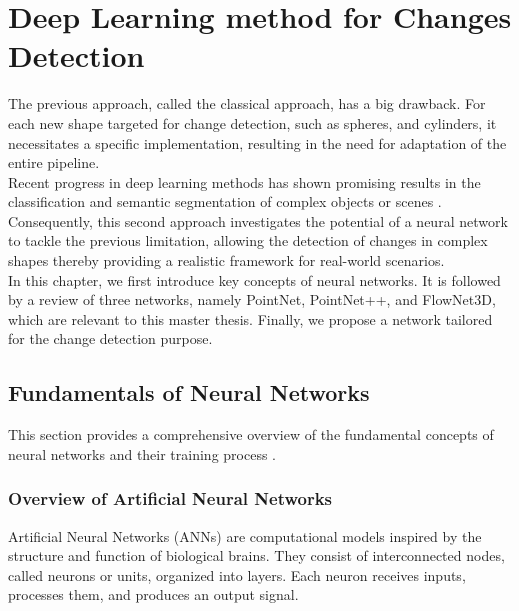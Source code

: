 \chapter{Deep Learning method for Changes Detection}
The previous approach, called the classical approach, has a big drawback. For each new shape targeted for change detection, such as spheres, and cylinders, it necessitates a specific implementation, resulting in the need for adaptation of the entire pipeline.\\

Recent progress in deep learning methods has shown promising results in the classification and semantic segmentation of complex objects or scenes \cite{DeepLearningPointCloud}. Consequently, this second approach investigates the potential of a neural network to tackle the previous limitation, allowing the detection of changes in complex shapes thereby providing a realistic framework for real-world scenarios.\\

In this chapter, we first introduce key concepts of neural networks. It is followed by a review of three networks, namely PointNet, PointNet++, and FlowNet3D, which are relevant to this master thesis. Finally, we propose a network tailored for the change detection purpose.

\section{Fundamentals of Neural Networks}
This section provides a comprehensive overview of the fundamental concepts of neural networks and their training process \cite{LINFO2262}. 
\subsection{Overview of Artificial Neural Networks}
Artificial Neural Networks (ANNs) are computational models inspired by the structure and function of biological brains. They consist of interconnected nodes, called neurons or units, organized into layers. Each neuron receives inputs, processes them, and produces an output signal.\\

